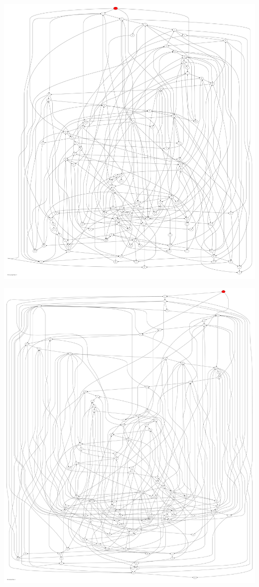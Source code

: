 \documentclass{article}
\begin{document}
\newpage
\includegraphics[max height=\textheight,max width=\textwidth]{bl_looming_objs/bl_loom_obj3_pp.pdf}

\newpage
\includegraphics[max height=\textheight,max width=\textwidth]{bl_looming_objs/bl_loom_obj4_pp.pdf}
\end{document}
